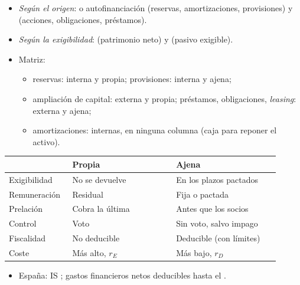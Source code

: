 \documentclass{article}
\begin{document}
\begin{columnas}
\begin{itemize}
\item \emph{Según el origen}:  o autofinanciación (reservas, amortizaciones, provisiones) y  (acciones, obligaciones, préstamos).
\item \emph{Según la exigibilidad}:  (patrimonio neto) y  (pasivo exigible).
\item Matriz:
  \begin{itemize}
  \item reservas: interna y propia; provisiones: interna y ajena;
  \item ampliación de capital: externa y propia; préstamos, obligaciones, \emph{leasing}: externa y ajena;
  \item amortizaciones: internas, en ninguna columna (caja para reponer el activo).
  \end{itemize}
\end{itemize}
\begin{tabular}{@{}>{\raggedright\arraybackslash}p{0.22\linewidth}>{\raggedright\arraybackslash}p{0.36\linewidth}>{\raggedright\arraybackslash}p{0.36\linewidth}@{}}
\toprule
& \textbf{Propia} & \textbf{Ajena} \\
\midrule
Exigibilidad & No se devuelve & En los plazos pactados \\
Remuneración & Residual & Fija o pactada \\
Prelación & Cobra la última & Antes que los socios \\
Control & Voto & Sin voto, salvo impago \\
Fiscalidad & No deducible & Deducible (con límites) \\
Coste & Más alto, $r_E$ & Más bajo, $r_D$ \\
\bottomrule
\end{tabular}
\begin{itemize}
\item España: IS ; gastos financieros netos deducibles hasta el  .
\end{itemize}


\end{columnas}
\end{document}
